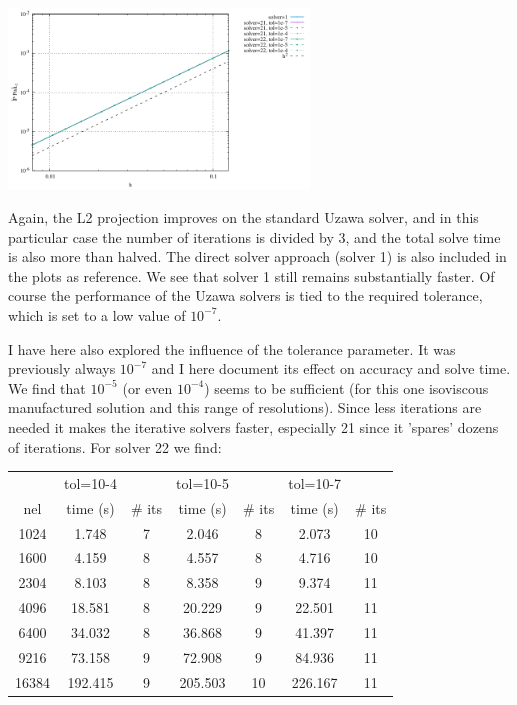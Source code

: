 \begin{center}
\includegraphics[width=8cm]{python_codes/fieldstone_147/RESULTS/L2/uzawa3/errorsP.pdf}
\end{center}

Again, the L2 projection improves on the standard Uzawa solver, and in 
this particular case the number of iterations is divided by 3, and the total solve 
time is also more than halved.
The direct solver approach (solver 1) is also included in the plots as reference. 
We see that solver 1 still remains substantially faster.
Of course the performance of the Uzawa solvers is tied to the required tolerance,
which is set to a low value of $10^{-7}$.

I have here also explored the influence of the tolerance parameter. 
It was previously always $10^{-7}$ and I here document its effect on 
accuracy and solve time. 
We find that $10^{-5}$ (or even $10^{-4}$) seems to be sufficient (for this one isoviscous manufactured solution
and this range of resolutions). Since less iterations are needed it makes the iterative 
solvers faster, especially 21 since it 'spares' dozens of iterations. 
For solver 22 we find:

\begin{center}
\begin{tabular}{|c|cc|cc|cc|}
\hline
& tol=10-4 & & tol=10-5 & & tol=10-7 & \\
nel   & time (s) & \# its &  time (s) & \# its &  time (s) & \# its  \\ 
\hline
1024  & 1.748    &  7  &2.046  &   8  & 2.073    & 10\\
1600  & 4.159    &  8  &4.557  &   8  & 4.716    & 10 \\
2304  & 8.103    &  8  &8.358  &   9  &  9.374   & 11\\
4096  & 18.581   &  8  &20.229 &   9  &  22.501  & 11\\
6400  & 34.032   &  8  &36.868 &   9  &  41.397  & 11 \\
9216  & 73.158   &  9  &72.908 &   9  &  84.936  & 11 \\
16384 & 192.415  &  9  &205.503&   10 &  226.167 & 11\\
\hline
\end{tabular}
\end{center}


